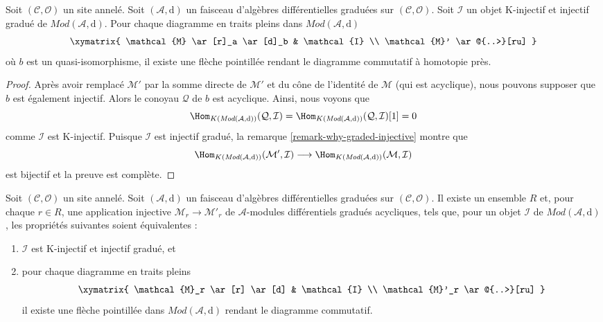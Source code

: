 \begin{lemma}
\label{lemma-second-property-dg-injective} Soit
$(\mathcal{C}, \mathcal{O})$ un site annelé. Soit
$(\mathcal{A}, \text{d})$ un faisceau d'algèbres différentielles graduées sur
$(\mathcal{C}, \mathcal{O})$. Soit $\mathcal{I}$ un objet K-injectif
et injectif gradué de
$\textit{Mod}(\mathcal{A}, \text{d})$. Pour chaque diagramme
en traits pleins dans $\textit{Mod}(\mathcal{A}, \text{d})$
$$
\xymatrix{
\mathcal{M} \ar[r]_a \ar[d]_b & \mathcal{I} \\
\mathcal{M}' \ar@{..>}[ru]
}
$$ où
$b$ est un quasi-isomorphisme, il existe une flèche pointillée rendant le diagramme
commutatif à homotopie près.
\end{lemma}

\begin{proof}
Après avoir remplacé $\mathcal{M}'$ par la somme directe de $\mathcal{M}'$
et du cône de l'identité de $\mathcal{M}$ (qui est acyclique), nous
pouvons supposer que $b$ est également injectif. Alors le conoyau $\mathcal{Q}$
de $b$ est acyclique. Ainsi,
nous voyons que $$
\Hom_{K(\textit{Mod}(\mathcal{A}, \text{d}))}(\mathcal{Q}, \mathcal{I})
= \Hom_{K(\textit{Mod}(\mathcal{A}, \text{d}))}(\mathcal{Q}, \mathcal{I})[1]
= 0 $$
comme $\mathcal{I}$ est K-injectif. Puisque $\mathcal{I}$ est injectif
gradué, la remarque \ref{remark-why-graded-injective}
montre
que $$
\Hom_{K(\textit{Mod}(\mathcal{A}, \text{d}))}(\mathcal{M}', \mathcal{I})
\longrightarrow
\Hom_{K(\textit{Mod}(\mathcal{A}, \text{d}))}(\mathcal{M}, \mathcal{I})
$$
est bijectif et la preuve est complète.
\end{proof}

\begin{lemma}
\label{lemma-better-set-of-monos} Soit
$(\mathcal{C}, \mathcal{O})$ un site annelé. Soit
$(\mathcal{A}, \text{d})$ un faisceau
d'algèbres différentielles graduées sur $(\mathcal{C}, \mathcal{O})$. Il existe un
ensemble $R$ et, pour chaque $r \in R$, une application injective
$\mathcal{M}_r \to \mathcal{M}'_r$ de
$\mathcal{A}$-modules différentiels gradués acycliques, tels que,
pour un objet $\mathcal{I}$ de $\textit{Mod}(\mathcal{A}, \text{d})$, les propriétés
suivantes soient équivalentes :
\begin{enumerate}
\item $\mathcal{I}$ est K-injectif et injectif gradué, et
\item pour chaque diagramme en traits pleins
$$
\xymatrix{
\mathcal{M}_r \ar[r] \ar[d] & \mathcal{I} \\
\mathcal{M}'_r \ar@{..>}[ru]
}
$$ il
existe une flèche pointillée dans $\textit{Mod}(\mathcal{A}, \text{d})$
rendant le diagramme commutatif.
\end{enumerate}
\end{lemma}

